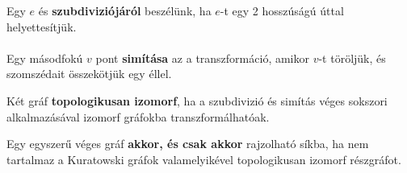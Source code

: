 \documentclass{beamer}
\begin{document}
\begin{frame}
\begin{tcolorbox}[title={Def.: Szubdivízió, Simítás}]
Egy $e$ és \textbf{szubdiviziójáról} beszélünk, ha $e$-t egy 2 hosszúságú úttal helyettesítjük.\\
\\
Egy másodfokú $v$ pont \textbf{simítása} az a transzformáció, amikor $v$-t töröljük, és szomszédait összekötjük egy éllel.
\end{tcolorbox}

\begin{tcolorbox}[title={Def.: Topologikus izomorfia}]
Két gráf \textbf{topologikusan izomorf}, ha a szubdivizió és simítás véges sokszori alkalmazásával izomorf gráfokba transzformálhatóak.
\end{tcolorbox}

\begin{tcolorbox}[title={Tétel: Kuratowski tétel}]
Egy egyszerű véges gráf \textbf{akkor, és csak akkor} rajzolható síkba, ha nem tartalmaz a Kuratowski gráfok valamelyikével topologikusan izomorf részgráfot.
\end{tcolorbox}
\end{frame}
\end{document}
